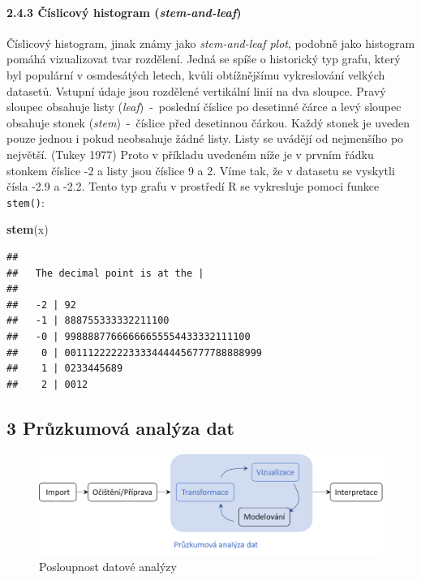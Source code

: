\documentclass[12pt,]{article}
\newenvironment{Shaded}{\begin{snugshade}}{\end{snugshade}}
\newcommand{\KeywordTok}[1]{\textcolor[rgb]{0.13,0.29,0.53}{\textbf{#1}}}
\newcommand{\NormalTok}[1]{#1}
\let\oldparagraph\paragraph
\renewcommand{\paragraph}[1]{\oldparagraph{#1}\mbox{}}
\begin{document}
\hypertarget{stem-and-leaf}{\paragraph{\texorpdfstring{2.4.3 Číslicový
histogram
(\emph{stem-and-leaf})}{2.4.3 Číslicový histogram (stem-and-leaf)}}\label{stem-and-leaf}}

\qquad Číslicový histogram, jinak známy jako \emph{stem-and-leaf plot},
podobně jako histogram pomáhá vizualizovat tvar rozdělení. Jedná se
spíše o historický typ grafu, který byl populární v osmdesátých letech,
kvůli obtížnějšímu vykreslování velkých datasetů. Vstupní údaje jsou
rozdělené vertikální linií na dva sloupce. Pravý sloupec obsahuje listy
(\emph{leaf})~-~poslední číslice po desetinné čárce a levý sloupec
obsahuje stonek (\emph{stem})~-~číslice před desetinnou čárkou. Každý
stonek je uveden pouze jednou i pokud neobsahuje žádné listy. Listy se
uvádějí od nejmenšího po největší. (Tukey 1977) Proto v příkladu
uvedeném níže je v prvním řádku stonkem číslice -2 a listy jsou číslice
9 a 2. Víme tak, že v datasetu se vyskytli čísla -2.9 a -2.2. Tento typ
grafu v prostředí R se vykresluje pomoci funkce \texttt{stem()}:

\begin{Shaded}
\begin{Highlighting}[]
\KeywordTok{stem}\NormalTok{(x)}
\end{Highlighting}
\end{Shaded}

\begin{verbatim}
## 
##   The decimal point is at the |
## 
##   -2 | 92
##   -1 | 888755333332211100
##   -0 | 99888877666666655554433332111100
##    0 | 0011122222233334444456777788888999
##    1 | 0233445689
##    2 | 0012
\end{verbatim}

\newpage

\hypertarget{EDA}{\subsection{3 Průzkumová analýza dat}\label{EDA}}

\begin{figure}[H]

{\centering \includegraphics[width=1\linewidth]{fig/EDA_diagram2} 

}

\caption{\label{fig:ch3.1} Posloupnost datové analýzy}\label{fig:diagram_img}
\end{figure}
\end{document}
